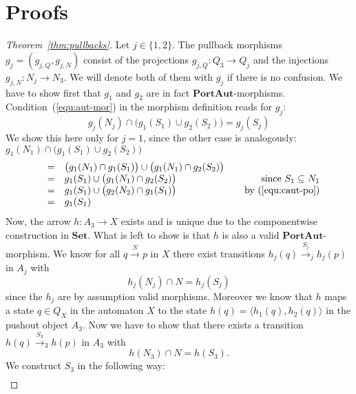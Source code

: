 \documentclass[copyright,creativecommons]{eptcs}
\newcommand{\Set}{\ensuremath{\mathbf{Set}}}
\newcommand{\PA}{\ensuremath{\mathbf{PortAut}}}
\begin{document}
\appendix

\section{Proofs}
\label{sec:proofs}

\begin{proof}[Theorem~\ref{thm:pullbacks}]
Let $j\in \{1,2\}$. The pullback morphisms $g_j=(g_{j,Q},g_{j,N})$ consist of
the projections $g_{j,Q}: Q_3\to Q_j$ and the injections $g_{j,N}: N_j \to
N_3$. We will denote both of them with $g_j$ if there is no confusion. We have
to show first that $g_1$ and $g_2$ are in fact \PA-morphisms.
Condition~(\ref{equ:aut-mor}) in the morphism definition reads for $g_j$:  
\[ 
	g_j(N_j) \cap \bigl(g_1(S_1) \cup g_2(S_2) \bigr) = g_j(S_j) 
\]
We show this here only for $j=1$, since the other case is analogously:
\vspace{3mm}\\
$g_1(N_1) \cap \bigl(g_1(S_1) \cup g_2(S_2)\bigr)$
\vspace{-3mm}
\setlength{\extrarowheight}{2mm}
\[
\begin{array}{rclr}
			 & = & \bigl(g_1(N_1) \cap g_1(S_1)\bigr) \cup \bigl(g_1(N_1) \cap g_2(S_2)\bigr) \\
			 & = & g_1(S_1) \cup \bigl(g_1(N_1) \cap g_2(S_2)\bigr) 	& \hspace{1cm} \mbox{since } S_1\subseteq N_1 \\
			 & = & g_1(S_1) \cup \bigl(g_2(N_2) \cap g_1(S_1)\bigr) 	& \mbox{by (\ref{equ:caut-po})} \\
			 & = & g_1(S_1)
\end{array}
\]
Now, the arrow $h: A_3 \to X$ exists and is unique due to the componentwise construction in \Set. What is left
to show is that $h$ is also a valid \PA-morphism.
We know for all $q \overset{N}{\longrightarrow} p$ in $X$
there exist transitions $h_j(q) \overset{S_j}{\longrightarrow}_j h_j(p)$ in $A_j$ with
\begin{equation}
	\label{equ:caut-po-mors}
	h_j(N_j) \cap N = h_j(S_j)
\end{equation}
since the $h_j$ are by assumption valid morphisms. Moreover we know that $h$ maps
a state $q\in Q_X$ in the automaton $X$ to the state
$h(q) = \langle h_1(q),h_2(q) \rangle$
in the pushout object $A_3$. Now we have to show that there exists a transition 
$h(q) \overset{S_3}{\longrightarrow}_3 h(p)$ in $A_3$ with 
\[ h(N_3) \cap N = h(S_3). \]
We construct $S_3$ in the following way:
\[
\begin{array}{rclr}

\end{array}\]
\end{proof}
\end{document}
